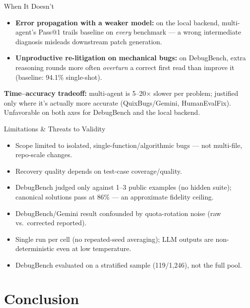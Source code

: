 \documentclass[aspectratio=169]{beamer}
\begin{document}
\begin{frame}{When It Doesn't}
\begin{itemize}
    \item \textbf{Error propagation with a weaker model:} on the local backend, multi-agent's Pass@1 trails baseline on \emph{every} benchmark --- a wrong intermediate diagnosis misleads downstream patch generation.
    \item \textbf{Unproductive re-litigation on mechanical bugs:} on DebugBench, extra reasoning rounds more often \emph{overturn} a correct first read than improve it (baseline: 94.1\% single-shot).
\end{itemize}
\vspace{6pt}
\textbf{Time--accuracy tradeoff:} multi-agent is 5--20$\times$ slower per problem; justified only where it's actually more accurate (QuixBugs/Gemini, HumanEvalFix). Unfavorable on both axes for DebugBench and the local backend.
\end{frame}

\begin{frame}{Limitations \& Threats to Validity}
\small
\begin{itemize}
    \item Scope limited to isolated, single-function/algorithmic bugs --- not multi-file, repo-scale changes.
    \item Recovery quality depends on test-case coverage/quality.
    \item DebugBench judged only against 1--3 public examples (no hidden suite); canonical solutions pass at 86\% --- an approximate fidelity ceiling.
    \item DebugBench/Gemini result confounded by quota-rotation noise (raw vs.\ corrected reported).
    \item Single run per cell (no repeated-seed averaging); LLM outputs are non-deterministic even at low temperature.
    \item DebugBench evaluated on a stratified sample (119/1{,}246), not the full pool.
\end{itemize}
\end{frame}

\section{Conclusion}
\end{document}
